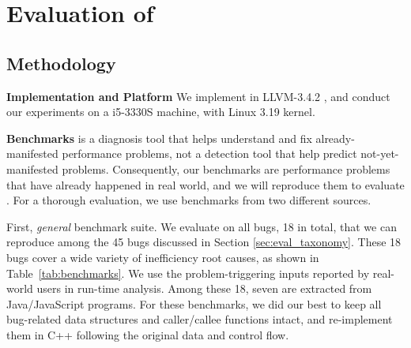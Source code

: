 \section{Evaluation of \Tool}
\label{sec:experiment}

\subsection{Methodology}
\label{sec:result_meth}



\noindent\textbf{Implementation and Platform}
We implement \Tool in LLVM-3.4.2 \cite{llvm}, and conduct our
experiments on a i5-3330S machine, with Linux 3.19 kernel. 

\noindent\textbf{Benchmarks}
\Tool is a diagnosis tool that helps understand and fix 
already-manifested performance problems,
not a detection tool that help predict not-yet-manifested
problems. Consequently, our benchmarks are performance problems that have already
happened in real world, and we will reproduce them to evaluate \Tool.
For a thorough evaluation, we use
benchmarks from two different sources.

First, \emph{general} benchmark suite.
We evaluate \Tool on all bugs, 18 in total, that we can reproduce 
among the 45 bugs discussed in Section \ref{sec:eval_taxonomy}. 
These 18 bugs cover a wide variety of inefficiency root causes, as 
shown in Table~\ref{tab:benchmarks}. 
We use the problem-triggering inputs reported by real-world
users in \Tool run-time analysis.
Among these 18, seven are extracted from Java/JavaScript
programs.
For these benchmarks, we did our best to keep all bug-related data structures
and caller/callee functions intact, and re-implement them in C++
following the original data and control flow. 

